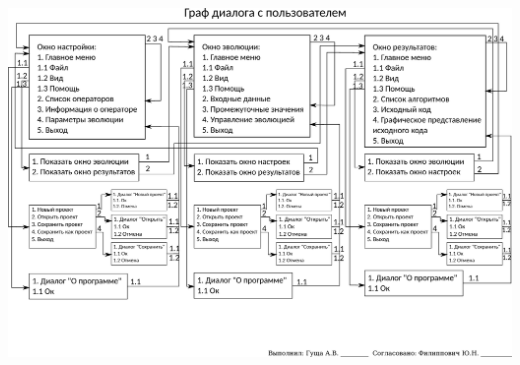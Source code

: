 \documentclass[russian,utf8, a1paper]{eskdgraph}
\begin{document}
\begin{ESKDdrawing}
\includegraphics[scale=0.99]{list7}
\end{ESKDdrawing}
\end{document}
